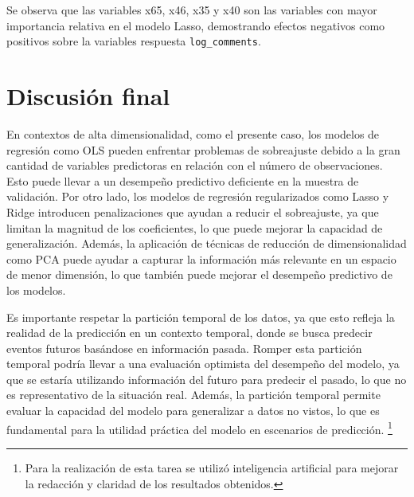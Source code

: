 \documentclass[12pt,a4paper]{article}
\begin{document}
Se observa que las variables x65, x46, x35 y x40 son las variables con mayor importancia relativa en el modelo Lasso, demostrando efectos negativos como positivos sobre la variables respuesta \texttt{log\_comments}.

\newpage

\section{Discusión final}

En contextos de alta dimensionalidad, como el presente caso, los modelos de regresión como OLS pueden enfrentar problemas de sobreajuste debido a la gran cantidad de variables predictoras en relación con el número de observaciones. Esto puede llevar a un desempeño predictivo deficiente en la muestra de validación. Por otro lado, los modelos de regresión regularizados como Lasso y Ridge introducen penalizaciones que ayudan a reducir el sobreajuste, ya que limitan la magnitud de los coeficientes, lo que puede mejorar la capacidad de generalización. Además, la aplicación de técnicas de reducción de dimensionalidad como PCA puede ayudar a capturar la información más relevante en un espacio de menor dimensión, lo que también puede mejorar el desempeño predictivo de los modelos.

Es importante respetar la partición temporal de los datos, ya que esto refleja la realidad de la predicción en un contexto temporal, donde se busca predecir eventos futuros basándose en información pasada. Romper esta partición temporal podría llevar a una evaluación optimista del desempeño del modelo, ya que se estaría utilizando información del futuro para predecir el pasado, lo que no es representativo de la situación real. Además, la partición temporal permite evaluar la capacidad del modelo para generalizar a datos no vistos, lo que es fundamental para la utilidad práctica del modelo en escenarios de predicción. \footnote{Para la realización de esta tarea se utilizó inteligencia artificial para mejorar la redacción y claridad de los resultados obtenidos.}
\end{document}
